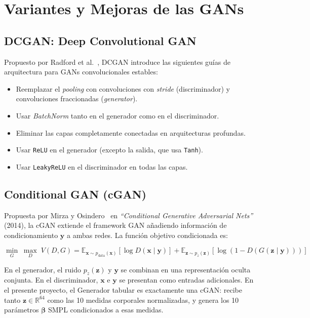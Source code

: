 \documentclass[a4paper,11pt]{article}
\begin{document}
\section{Variantes y Mejoras de las GANs}

\subsection{DCGAN: Deep Convolutional GAN}

Propuesto por Radford et al.~\cite{radford2015}, DCGAN introduce las siguientes
guías de arquitectura para GANs convolucionales estables:

\begin{itemize}
    \item Reemplazar el \textit{pooling} con convoluciones con \textit{stride}
          (discriminador) y convoluciones fraccionadas (\textit{generator}).
    \item Usar \textit{BatchNorm} tanto en el generador como en el discriminador.
    \item Eliminar las capas completamente conectadas en arquitecturas profundas.
    \item Usar \texttt{ReLU} en el generador (excepto la salida, que usa
          \texttt{Tanh}).
    \item Usar \texttt{LeakyReLU} en el discriminador en todas las capas.
\end{itemize}

\subsection{Conditional GAN (cGAN)}
\label{sec:cgan}

Propuesta por Mirza y Osindero~\cite{mirza2014} en
\textit{``Conditional Generative Adversarial Nets''} (2014), la cGAN extiende
el framework GAN añadiendo información de condicionamiento $\bm{y}$ a ambas
redes. La función objetivo condicionada es:

\begin{equation}
    \label{eq:cgan}
    \min_{G}\;\max_{D}\;V(D,G)
    = \mathbb{E}_{\bm{x}\sim p_{\text{data}}(\bm{x})}\!\left[\log D(\bm{x}\mid\bm{y})\right]
    + \mathbb{E}_{\bm{z}\sim p_z(\bm{z})}\!\left[\log\!\left(1-D(G(\bm{z}\mid\bm{y}))\right)\right]
\end{equation}

En el generador, el ruido $p_z(\bm{z})$ y $\bm{y}$ se combinan en una
representación oculta conjunta. En el discriminador, $\bm{x}$ e $\bm{y}$
se presentan como entradas adicionales. En el presente proyecto, el Generador
tabular es exactamente una cGAN: recibe tanto $\bm{z}\in\mathbb{R}^{64}$
como las 10 medidas corporales normalizadas, y genera los 10 parámetros
$\bm{\beta}$ SMPL condicionados a esas medidas.
\end{document}

